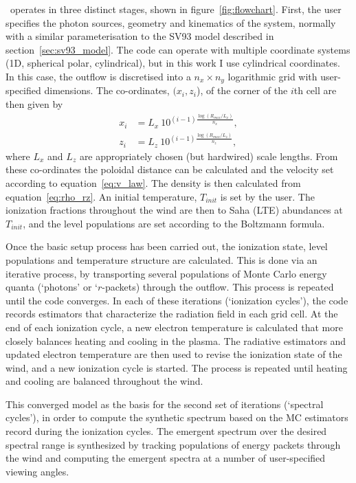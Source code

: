 \py\ operates in three distinct stages, shown in figure~\ref{fig:flowchart}. 
First, the user specifies the photon sources,
geometry and kinematics of the system, normally with a similar parameterisation
to the SV93 model described in section~\ref{sec:sv93_model}. 
The code can operate with multiple coordinate systems 
(1D, spherical polar, cylindrical), but in this work I use cylindrical coordinates.
In this case, the outflow is discretised into a $n_x \times n_y$ logarithmic grid with 
user-specified dimensions. The co-ordinates, $(x_i, z_i$), 
of the corner of the $i$th cell are then given by
\begin{align}
x_i &= L_{x}~10^{(i-1)\frac{\log (R_{max} / L_{x})}{n_x}},\\
z_i &= L_{z}~10^{(i-1)\frac{\log (R_{max} / L_{z})}{n_z}},
\end{align}
where $L_x$ and $L_z$ are appropriately chosen (but hardwired) scale lengths.
From these co-ordinates the poloidal distance can be calculated and
the velocity set according to equation~\ref{eq:v_law}. The density
is then calculated from equation~\ref{eq:rho_rz}. An initial temperature,
$T_{init}$ is set by the user. The ionization fractions throughout
the wind are then to Saha (LTE) abundances at $T_{init}$, and the level 
populations are set according to the Boltzmann formula.

Once the basic setup process has been carried out, the ionization state,
level populations and temperature structure are calculated.
This is done via an iterative process, by transporting several populations of 
Monte Carlo energy quanta (`photons' or `$r$-packets) through the outflow.
This process is repeated until the code converges. 
In each of these iterations (`ionization cycles'), the code records estimators that 
characterize the radiation field in each grid cell. At the end 
of each ionization cycle, a new electron temperature is calculated
that more closely balances heating and cooling in the 
plasma. The radiative estimators and updated electron
temperature are then used to revise the ionization state of the wind,
and a new ionization cycle is started. The process is repeated until
heating and cooling are balanced throughout the wind. 

This converged model as the basis for the second set of
iterations (`spectral cycles'), in order to compute the synthetic spectrum based on the 
MC estimators record during the ionization cycles. 
The emergent spectrum over the desired spectral range is synthesized by 
tracking populations of energy packets through the wind and computing the emergent spectra at
a number of user-specified viewing angles.  

